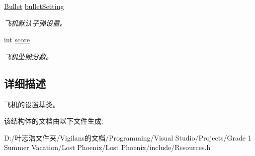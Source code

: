 \begin{DoxyCompactItemize}
\mbox{\label{struct_settings_1_1_plane_a8416c74c0910b4c7a9da8d633e0c346a}} 
\hyperlink{struct_settings_1_1_bullet}{Bullet} \hyperlink{struct_settings_1_1_plane_a8416c74c0910b4c7a9da8d633e0c346a}{bullet\+Setting}
\begin{DoxyCompactList}\small\item\em 飞机默认子弹设置。 \end{DoxyCompactList}\item 
\mbox{\label{struct_settings_1_1_plane_a20a8861d723406f4d49610804226dd82}} 
int \hyperlink{struct_settings_1_1_plane_a20a8861d723406f4d49610804226dd82}{score}
\begin{DoxyCompactList}\small\item\em 飞机坠毁分数。 \end{DoxyCompactList}\end{DoxyCompactItemize}


\subsection{详细描述}
飞机的设置基类。 



该结构体的文档由以下文件生成\+:\begin{DoxyCompactItemize}
\item 
D\+:/叶志浩文件夹/\+Vigilans的文档/\+Programming/\+Visual Studio/\+Projects/\+Grade 1 Summer Vacation/\+Lost Phoenix/\+Lost Phoenix/include/Resources.\+h\end{DoxyCompactItemize}
